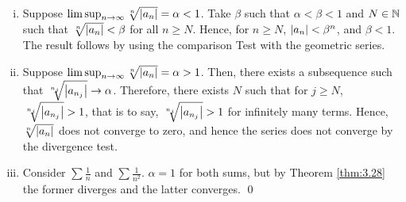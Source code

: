 \begin{nproof}
    \begin{enumerate}[(i)]
        \item Suppose $\limsup_{n \rightarrow \infty} \sqrt[n]{\abs{a_n}} = \alpha < 1$. Take $\beta$ such that $\alpha < \beta < 1$ and $N \in \mathbb{N}$ such that $\sqrt[n]{\abs{a_n}} < \beta$ for all $n \geq N$. Hence, for $n \geq N$, $\abs{a_n} < \beta^n$, and $\beta < 1$. The result follows by using the comparison Test with the geometric series.
        \item Suppose $\limsup_{n \rightarrow \infty} \sqrt[n]{\abs{a_n}} = \alpha > 1$. Then, there exists a subsequence such that $\sqrt[n_j]{\abs{a_{n_j}}} \rightarrow \alpha$. Therefore, there exists $N$ such that for $j \geq N$, $\sqrt[n_j]{\abs{a_{n_j}}} > 1$, that is to say, $\sqrt[n_j]{\abs{a_{n_j}}} > 1$ for infinitely many terms. Hence, $\sqrt[n]{\abs{a_{n}}}$ does not converge to zero, and hence the series does not converge by the divergence test.
        \item Consider $\sum \frac{1}{n}$ and $\sum \frac{1}{n^2}$. $\alpha = 1$ for both sums, but by Theorem \ref{thm:3.28} the former diverges and the latter converges. \qed
    \end{enumerate}
\end{nproof}

